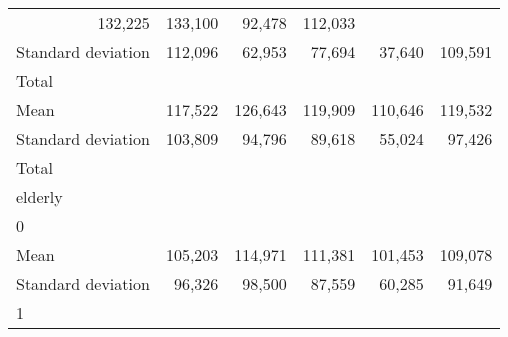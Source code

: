 \begin{tabular}{llllll}
  \multicolumn{1}{r}{132,225} &
  \multicolumn{1}{r}{133,100} &
  \multicolumn{1}{r}{92,478} &
  \multicolumn{1}{r}{112,033} \\
\multicolumn{1}{l}{\hspace{4em}Standard deviation} &
  \multicolumn{1}{|r}{112,096} &
  \multicolumn{1}{r}{62,953} &
  \multicolumn{1}{r}{77,694} &
  \multicolumn{1}{r}{37,640} &
  \multicolumn{1}{r}{109,591} \\
\multicolumn{1}{l}{\hspace{3em}Total} &
  \multicolumn{1}{|r}{} &
  \multicolumn{1}{r}{} &
  \multicolumn{1}{r}{} &
  \multicolumn{1}{r}{} &
  \multicolumn{1}{r}{} \\
\multicolumn{1}{l}{\hspace{4em}Mean} &
  \multicolumn{1}{|r}{117,522} &
  \multicolumn{1}{r}{126,643} &
  \multicolumn{1}{r}{119,909} &
  \multicolumn{1}{r}{110,646} &
  \multicolumn{1}{r}{119,532} \\
\multicolumn{1}{l}{\hspace{4em}Standard deviation} &
  \multicolumn{1}{|r}{103,809} &
  \multicolumn{1}{r}{94,796} &
  \multicolumn{1}{r}{89,618} &
  \multicolumn{1}{r}{55,024} &
  \multicolumn{1}{r}{97,426} \\
\multicolumn{1}{l}{\hspace{1em}Total} &
  \multicolumn{1}{|r}{} &
  \multicolumn{1}{r}{} &
  \multicolumn{1}{r}{} &
  \multicolumn{1}{r}{} &
  \multicolumn{1}{r}{} \\
\multicolumn{1}{l}{\hspace{2em}elderly} &
  \multicolumn{1}{|r}{} &
  \multicolumn{1}{r}{} &
  \multicolumn{1}{r}{} &
  \multicolumn{1}{r}{} &
  \multicolumn{1}{r}{} \\
\multicolumn{1}{l}{\hspace{3em}0} &
  \multicolumn{1}{|r}{} &
  \multicolumn{1}{r}{} &
  \multicolumn{1}{r}{} &
  \multicolumn{1}{r}{} &
  \multicolumn{1}{r}{} \\
\multicolumn{1}{l}{\hspace{4em}Mean} &
  \multicolumn{1}{|r}{105,203} &
  \multicolumn{1}{r}{114,971} &
  \multicolumn{1}{r}{111,381} &
  \multicolumn{1}{r}{101,453} &
  \multicolumn{1}{r}{109,078} \\
\multicolumn{1}{l}{\hspace{4em}Standard deviation} &
  \multicolumn{1}{|r}{96,326} &
  \multicolumn{1}{r}{98,500} &
  \multicolumn{1}{r}{87,559} &
  \multicolumn{1}{r}{60,285} &
  \multicolumn{1}{r}{91,649} \\
\multicolumn{1}{l}{\hspace{3em}1} &

\end{tabular}
